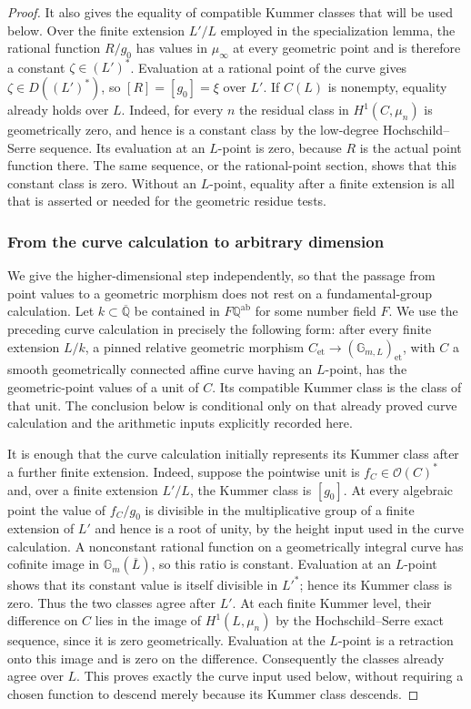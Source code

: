 \begin{proof}
It also gives the equality of compatible Kummer classes that will
be used below. Over the finite extension $L'/L$ employed in the
specialization lemma, the rational function $R/g_0$ has values in
$\mu_\infty$ at every geometric point and is therefore a constant
$\zeta\in(L')^*$. Evaluation at a rational point of the curve gives
$\zeta\in D((L')^*)$, so $[R]=[g_0]=\xi$ over $L'$.
If $C(L)$ is nonempty, equality already holds over $L$. Indeed,
for every $n$ the residual class in $H^1(C,\mu_n)$ is geometrically
zero, and hence is a constant class by the low-degree
Hochschild--Serre sequence. Its evaluation at an $L$-point is zero,
because $R$ is the actual point function there. The same sequence,
or the rational-point section, shows that this constant class is
zero. Without an $L$-point, equality after a finite extension is all
that is asserted or needed for the geometric residue tests.

\subsubsection*{From the curve calculation to arbitrary dimension}

We give the higher-dimensional step independently, so that the passage
from point values to a geometric morphism does not rest on a
fundamental-group calculation. Let $k\subset\overline{\mathbb Q}$ be
contained in $F\mathbb Q^{\mathrm{ab}}$ for some number field $F$.
We use the preceding curve calculation in precisely the following
form: after every finite extension $L/k$, a pinned relative geometric
morphism $C_{\mathrm{et}}\to(\mathbb G_{m,L})_{\mathrm{et}}$, with
$C$ a smooth geometrically connected affine curve having an $L$-point,
has the geometric-point values of a unit of $C$. Its compatible Kummer
class is the class of that unit. The conclusion below is conditional
only on that already proved curve calculation and the arithmetic
inputs explicitly recorded here.

It is enough that the curve calculation initially represents its
Kummer class after a further finite extension. Indeed, suppose the
pointwise unit is $f_C\in\mathcal O(C)^*$ and, over a finite
extension $L'/L$, the Kummer class is $[g_0]$. At every algebraic
point the value of $f_C/g_0$ is divisible in the multiplicative group
of a finite extension of $L'$ and hence is a root of unity, by the
height input used in the curve calculation. A nonconstant rational
function on a geometrically integral curve has cofinite image in
$\mathbb G_m(\overline L)$, so this ratio is constant. Evaluation at
an $L$-point shows that its constant value is itself divisible in
$L'^*$; hence its Kummer class is zero. Thus the two classes agree
after $L'$. At each finite Kummer level, their difference on $C$
lies in the image of $H^1(L,\mu_n)$ by the Hochschild--Serre exact
sequence, since it is zero geometrically. Evaluation at the $L$-point
is a retraction onto this image and is zero on the difference.
Consequently the classes already agree over $L$. This proves exactly
the curve input used below, without requiring a chosen function to
descend merely because its Kummer class descends.


\end{proof}
